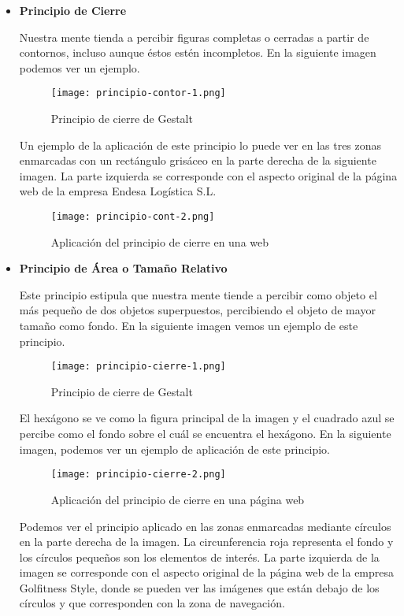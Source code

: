 \begin{itemize}
    \item \textbf{Principio de Cierre}

    Nuestra mente tienda a percibir figuras completas o cerradas a partir de contornos, incluso aunque éstos estén incompletos. En la siguiente imagen podemos ver un ejemplo.

    \begin{figure}[H]
        \centering
        \texttt{[image: principio-contor-1.png]}
        \caption{Principio de cierre de Gestalt}
    \end{figure}

    Un ejemplo de la aplicación de este principio lo puede ver en las tres zonas enmarcadas con un rectángulo grisáceo en la parte derecha de la siguiente imagen. La parte izquierda se corresponde con el aspecto original de la página web de la empresa Endesa Logística S.L.

    \begin{figure}[H]
        \centering
        \texttt{[image: principio-cont-2.png]}
        \caption{Aplicación del principio de cierre en una web}
    \end{figure}

    \item \textbf{Principio de Área o Tamaño Relativo}

    Este principio estipula que nuestra mente tiende a percibir como objeto el más pequeño de dos objetos superpuestos, percibiendo el objeto de mayor tamaño como fondo. En la siguiente imagen vemos un ejemplo de este principio.

    \begin{figure}[H]
        \centering
        \texttt{[image: principio-cierre-1.png]}
        \caption{Principio de cierre de Gestalt}
    \end{figure}

    El hexágono se ve como la figura principal de la imagen y el cuadrado azul se percibe como el fondo sobre el cuál se encuentra el hexágono. En la siguiente imagen, podemos ver un ejemplo de aplicación de este principio.

    \begin{figure}[H]
        \centering
        \texttt{[image: principio-cierre-2.png]}
        \caption{Aplicación del principio de cierre en una página web}
    \end{figure}

    Podemos ver el principio aplicado en las zonas enmarcadas mediante círculos en la parte derecha de la imagen. La circunferencia roja representa el fondo y los círculos pequeños son los elementos de interés. La parte izquierda de la imagen se corresponde con el aspecto original de la página web de la empresa Golfitness Style, donde se pueden ver las imágenes que están debajo de los círculos y que corresponden con la zona de navegación.
\end{itemize}

